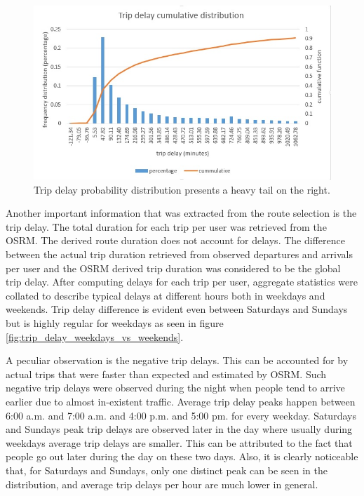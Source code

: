 \documentclass[12pt, a4paper]{report}
\theoremstyle{definition}
\theoremstyle{definition}%
\theoremstyle{definition}%
\theoremstyle{definition}%
\theoremstyle{definition}%
\theoremstyle{definition}%
\begin{document}
\begin{figure}[!]	
	\includegraphics[scale=0.80]{trip_delay_cumm_distribution_total.jpg}
	\centering
	\caption[Trip delay total cumulative distribution]{Trip delay probability distribution presents a heavy tail on the right.  }
	\label{fig:trip_delay_cum_distribution_heavy_tail}
\end{figure}

Another important information that was extracted from the route selection is the trip delay. The total duration for each trip per user was retrieved from the OSRM. The derived route duration does not account for delays. The difference between the actual trip duration retrieved from observed departures and arrivals per user and the OSRM derived trip duration was considered to be the global trip delay. After computing delays for each trip per user, aggregate statistics were collated to describe typical delays at different hours both in weekdays and weekends. Trip delay difference is evident even between Saturdays and Sundays but is highly regular for weekdays as seen in figure  \ref{fig:trip_delay_weekdays_vs_weekends}. 

A peculiar observation is the negative trip delays. This can be accounted for by actual trips that were faster than expected and estimated by OSRM. Such negative trip delays were observed during the night when people tend to arrive earlier due to almost in-existent traffic. Average trip delay peaks happen between 6:00 a.m. and 7:00 a.m. and 4:00 p.m. and 5:00 pm. for every weekday. Saturdays and Sundays peak trip delays are observed later in the day where usually during weekdays average trip delays are smaller. This can be attributed to the fact that people go out later during the day on these two days. Also, it is clearly noticeable that, for Saturdays and Sundays, only one distinct peak can be seen in the distribution, and average trip delays per hour are much lower in general.
\end{document}
